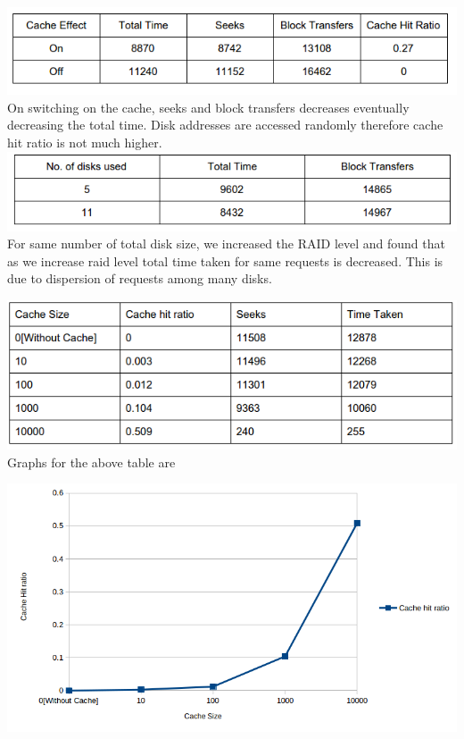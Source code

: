 \documentclass[11pt]{article}
\begin{document}
\includegraphics[scale = 0.60]{images/table2.png}\\

On switching on the cache, seeks and block transfers decreases eventually decreasing the total time. Disk addresses are accessed randomly therefore cache hit ratio is not much higher. 
\includegraphics[scale = 0.60]{images/table3.png}\\

For same number of total disk size, we increased the RAID level and found that as we increase raid level total time taken for same requests is decreased. This is due to dispersion of requests among many disks.

\includegraphics[scale = 0.60]{images/table4.png}\\
Graphs for the above table are

\includegraphics[scale = 0.60]{images/cache.png}\\
\end{document}

